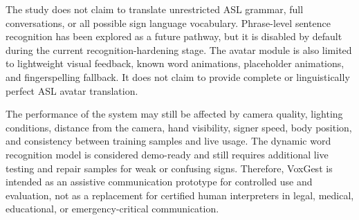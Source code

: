 The study does not claim to translate unrestricted ASL grammar, full conversations, or all possible sign language vocabulary. Phrase-level sentence recognition has been explored as a future pathway, but it is disabled by default during the current recognition-hardening stage. The avatar module is also limited to lightweight visual feedback, known word animations, placeholder animations, and fingerspelling fallback. It does not claim to provide complete or linguistically perfect ASL avatar translation.

The performance of the system may still be affected by camera quality, lighting conditions, distance from the camera, hand visibility, signer speed, body position, and consistency between training samples and live usage. The dynamic word recognition model is considered demo-ready and still requires additional live testing and repair samples for weak or confusing signs. Therefore, VoxGest is intended as an assistive communication prototype for controlled use and evaluation, not as a replacement for certified human interpreters in legal, medical, educational, or emergency-critical communication.
